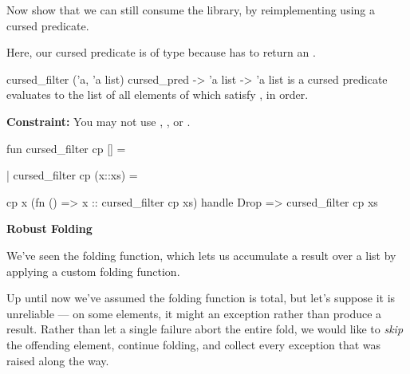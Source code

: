 \documentclass[addpoints,12pt, answers]{exam}
\newenvironment{constraint}{\color{constraint_color}\textbf{Constraint:}}{}
\begin{document}
\begin{questions}
\begin{parts}
    Now show that we can still consume the library, by reimplementing
     using a cursed predicate.

    Here, our cursed predicate is of type 
    because  has to return an .

    \spec
      {cursed_filter}
      {('a, 'a list) cursed_pred -> 'a list -> 'a list}
      { is a cursed predicate}
      { evaluates to the list of all elements of 
      which satisfy , in order.}

    \begin{constraint}
      You may not use , , or .
    \end{constraint}

    \begin{codeblock}
      fun cursed_filter cp [] =
    \end{codeblock}
    \begin{solutionorbox}[4em]
      \begin{codeblock}
        []
      \end{codeblock}
    \end{solutionorbox}

    \begin{codeblock}
        | cursed_filter cp (x::xs) =
    \end{codeblock}
    \begin{solutionorbox}[10em]
      \begin{codeblock}
        cp x (fn () => x :: cursed_filter cp xs)
        handle Drop => cursed_filter cp xs
      \end{codeblock}
    \end{solutionorbox}

\end{parts}

\newpage
{}

\textbf{Robust Folding}

We've seen the folding function, which lets us accumulate a result over
a list by applying a custom folding function.

Up until now we've assumed the folding function is total, but let's suppose
it is unreliable --- on some elements, it might  an exception rather
than produce a result. Rather than let a single failure abort the entire fold, we
would like to \textit{skip} the offending element, continue folding, and
collect every exception that was raised along the way.


\end{questions}
\end{document}
